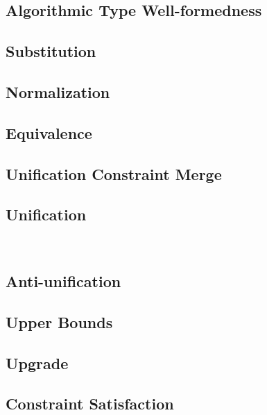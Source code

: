 \documentclass[a4,natbib=false]{article}
\newcommand{\genDir}{_gen}
\begin{document}
\subsection{Algorithmic Type Well-formedness}


\subsection{Substitution}


\subsection{Normalization}


\subsection{Equivalence}


\subsection{Unification Constraint Merge}


\subsection{Unification}
\

\subsection{Anti-unification}


\subsection{Upper Bounds}
\label{sec:alg-upper-bounds-proofs}


\subsection{Upgrade}
\label{sec:upgrade-lemmas}


\subsection{Constraint Satisfaction}

\end{document}
